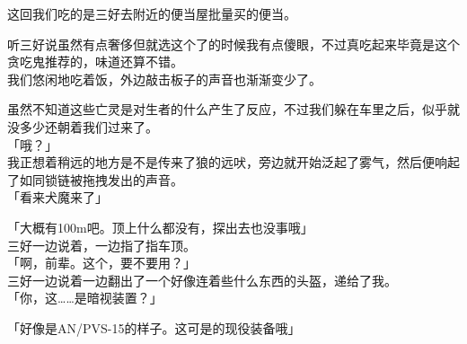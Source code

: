 这回我们吃的是三好去附近的便当屋批量买的便当。

听三好说虽然有点奢侈但就选这个了的时候我有点傻眼，不过真吃起来毕竟是这个贪吃鬼推荐的，味道还算不错。\\

我们悠闲地吃着饭，外边敲击板子的声音也渐渐变少了。

虽然不知道这些亡灵是对生者的什么产生了反应，不过我们躲在车里之后，似乎就没多少还朝着我们过来了。\\

「哦？」\\

我正想着稍远的地方是不是传来了狼的远吠，旁边就开始泛起了雾气，然后便响起了如同锁链被拖拽发出的声音。\\

「看来犬魔来了」

「大概有100m吧。顶上什么都没有，探出去也没事哦」\\

三好一边说着，一边指了指车顶。\\

「啊，前辈。这个，要不要用？」\\

三好一边说着一边翻出了一个好像连着些什么东西的头盔，递给了我。\\

「你，这……是暗视装置？」

「好像是AN/PVS-15的样子。这可是的现役装备哦」

